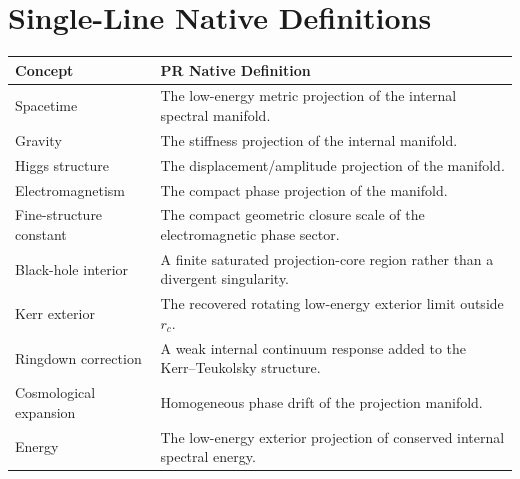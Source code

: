 \documentclass[11pt]{article}
\begin{document}
\section{Single-Line Native Definitions}

\begin{longtable}{>{\raggedright\arraybackslash}p{}
>{\raggedright\arraybackslash}p{}}
\toprule
\textbf{Concept} & \textbf{PR Native Definition} \\
\midrule
\endhead

Spacetime & The low-energy metric projection of the internal spectral manifold. \\
Gravity & The stiffness projection of the internal manifold. \\
Higgs structure & The displacement/amplitude projection of the manifold. \\
Electromagnetism & The compact phase projection of the manifold. \\
Fine-structure constant & The compact geometric closure scale of the electromagnetic phase sector. \\
Black-hole interior & A finite saturated projection-core region rather than a divergent singularity. \\
Kerr exterior & The recovered rotating low-energy exterior limit outside $r_c$. \\
Ringdown correction & A weak internal continuum response added to the Kerr--Teukolsky structure. \\
Cosmological expansion & Homogeneous phase drift of the projection manifold. \\
Energy & The low-energy exterior projection of conserved internal spectral energy. \\

\bottomrule
\end{longtable}
\end{document}
